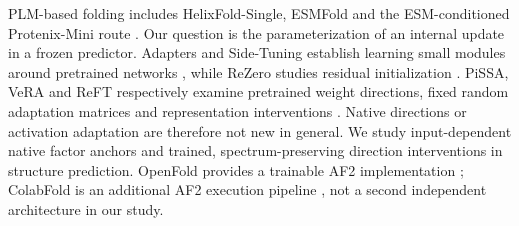PLM-based folding includes HelixFold-Single, ESMFold and the ESM-conditioned
Protenix-Mini route \citep{protenix,helixfold,esmfold}. Our question is the parameterization of an internal
update in a frozen predictor. Adapters and Side-Tuning establish learning small
modules around pretrained networks \citep{adapters,sidetuning}, while ReZero studies residual
initialization \citep{rezero}. PiSSA, VeRA and ReFT respectively examine pretrained weight
directions, fixed random adaptation matrices and representation interventions
\citep{pissa,vera,reft}. Native directions or activation adaptation are therefore not new in
general. We study input-dependent native factor anchors and trained,
spectrum-preserving direction interventions in structure prediction. OpenFold
provides a trainable AF2 implementation \citep{openfold}; ColabFold is an additional AF2
execution pipeline \citep{colabfold}, not a second independent architecture in our study.
